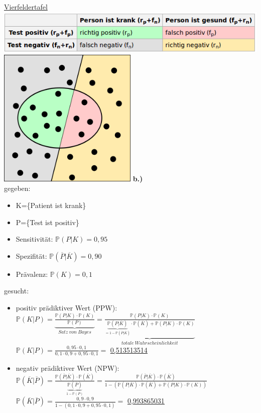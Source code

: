 \documentclass[13pt,a4paper]{article}
\begin{document}
\underline{Vierfeldertafel}\\
\includegraphics[width=1\textwidth]{Konfusionsmatrix.png}
\includegraphics[width=0.5\textwidth]{Binary-classification-file.png}
\newpage
\textbf{b.)}\\
gegeben:
\begin{itemize}
	\item K=\{Patient ist krank\}
	\item P=\{Test ist positiv\}
	\item Sensitivität: $\mathbb{P}(P|K)=0,95$
	\item Spezifität: $\mathbb{P}(\overline{P}|\overline{K})=0,90$
	\item Prävalenz: $\mathbb{P}(K)=0,1$
\end{itemize}

gesucht:\\
\begin{itemize}
	\item positiv prädiktiver Wert (PPW): \\
	$\mathbb{P}(K|P) = \underbrace{\frac{\mathbb{P}(P|K) \cdot \mathbb{P}(K)}{\mathbb{P}(P)}}_{Satz\ von\ Bayes} = \underbrace{\frac{\mathbb{P}(P|K) \cdot \mathbb{P}(K)}{\underbrace{\mathbb{P}(P|\overline{K})}_{=1-\mathbb{P}(\overline{P}|\overline{K})} \cdot \mathbb{P}(\overline{K}) + \mathbb{P}(P|K) \cdot \mathbb{P}(K)}}_{totale\ Wahrscheinlichkeit}$\\
	$\mathbb{P}(K|P) = \frac{0,95 \cdot 0,1}{0,1 \cdot 0,9 + 0,95 \cdot 0,1} = $ \underline{\underline{0,513513514}}
	\item negativ prädiktiver Wert (NPW):\\
	$\mathbb{P}(\overline{K}|\overline{P})= \frac{\mathbb{P}(\overline{P}|\overline{K}) \cdot \mathbb{P}(\overline{K})}{\underbrace{\mathbb{P}(\overline{P})}_{1-\mathbb{P}(P)}} = \frac{\mathbb{P}(\overline{P}|\overline{K}) \cdot \mathbb{P}(\overline{K})}{1 - (\mathbb{P}(P|\overline{K}) \cdot \mathbb{P}(\overline{K}) + \mathbb{P}(P|K) \cdot \mathbb{P}(K))}$\\
	$\mathbb{P}(\overline{K}|\overline{P})= \frac{0,9 \cdot 0,9}{1-(0,1 \cdot 0,9 + 0,95 \cdot 0,1)} =$ \underline{\underline{0,993865031}}
\end{itemize}
\end{document}
